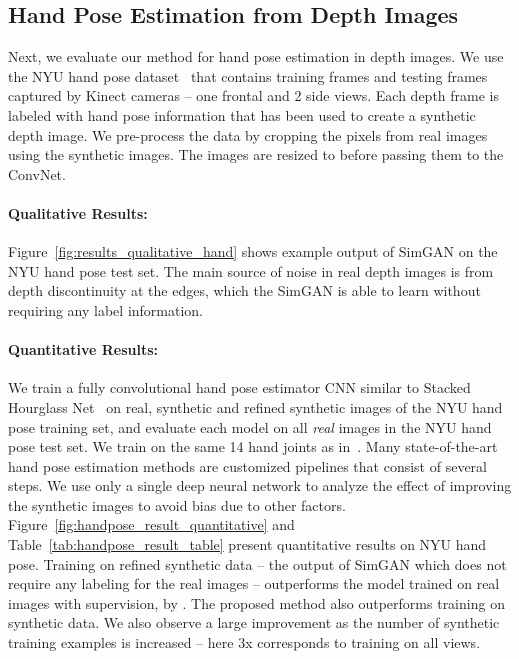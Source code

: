 \documentclass[10pt,twocolumn,letterpaper]{article}
\begin{document}
\subsection{Hand Pose Estimation from Depth Images}
Next, we evaluate our method for hand pose estimation in depth images. 
We use the NYU hand pose dataset~\cite{tompson14NYU} that contains  training frames and  testing frames captured by  Kinect cameras -- one frontal and 2 side views. 
Each depth frame is labeled with hand pose information that has been used to create a synthetic depth image. 
We pre-process the data by cropping the pixels from real images using the synthetic images. 
The images are resized to  before passing them to the ConvNet.




\vspace{-0.15in}
\paragraph{Qualitative Results:}
Figure~\ref{fig:results_qualitative_hand} shows example output of SimGAN on the NYU hand pose test set. 
The main source of noise in real depth images is from depth discontinuity at the edges, which the SimGAN is able to learn without requiring any label information.


\vspace{-0.15in}
\paragraph{Quantitative Results:} 
We train a fully convolutional hand pose estimator CNN similar to Stacked Hourglass Net~\cite{Newell16} on real, synthetic and refined synthetic images of the NYU hand pose training set, and evaluate each model on all \emph{real} images in the NYU hand pose test set.
We train on the same 14 hand joints as in~\cite{tompson14NYU}.
Many state-of-the-art hand pose estimation methods are customized pipelines that consist of several steps.  
We use only a single deep neural network to analyze the effect of improving the synthetic images to avoid bias due to other factors. 
Figure~\ref{fig:handpose_result_quantitative} and Table~\ref{tab:handpose_result_table} present quantitative results on NYU hand pose.
Training on refined synthetic data -- the output of SimGAN which does not require any labeling for the real images --  outperforms the model trained on real images with supervision, by .
The proposed method also outperforms training on synthetic data.
We also observe a large improvement as the number of synthetic training examples is increased -- here 3x corresponds to training on all views.
\end{document}
